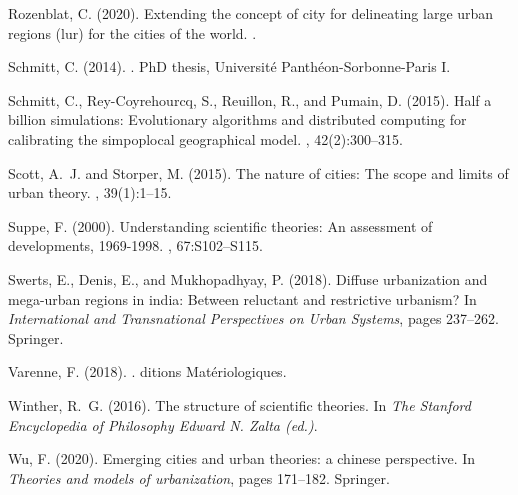 \documentclass[10pt]{article}
\begin{document}
\begin{thebibliography}{}
Rozenblat, C. (2020).
\newblock Extending the concept of city for delineating large urban regions
  (lur) for the cities of the world.
.

Schmitt, C. (2014).
.
\newblock PhD thesis, Universit{\'e} Panth{\'e}on-Sorbonne-Paris I.

Schmitt, C., Rey-Coyrehourcq, S., Reuillon, R., and Pumain, D. (2015).
\newblock Half a billion simulations: Evolutionary algorithms and distributed
  computing for calibrating the simpoplocal geographical model.
,
  42(2):300--315.

Scott, A.~J. and Storper, M. (2015).
\newblock The nature of cities: The scope and limits of urban theory.
,
  39(1):1--15.

Suppe, F. (2000).
\newblock Understanding scientific theories: An assessment of developments,
  1969-1998.
, 67:S102--S115.

Swerts, E., Denis, E., and Mukhopadhyay, P. (2018).
\newblock Diffuse urbanization and mega-urban regions in india: Between
  reluctant and restrictive urbanism?
\newblock In {\em International and Transnational Perspectives on Urban
  Systems}, pages 237--262. Springer.

Varenne, F. (2018).
.
ditions Mat{\'e}riologiques.

Winther, R.~G. (2016).
\newblock The structure of scientific theories.
\newblock In {\em The Stanford Encyclopedia of Philosophy Edward N. Zalta
  (ed.)}.

Wu, F. (2020).
\newblock Emerging cities and urban theories: a chinese perspective.
\newblock In {\em Theories and models of urbanization}, pages 171--182.
  Springer.

\end{thebibliography}
\end{document}
